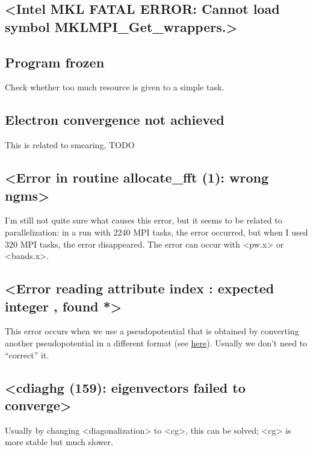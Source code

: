 \documentclass[hyperref, a4paper, 12pt]{report}
\def\texttt#1{<#1>}%
\newcommand{\shortcode}[1]{\texttt{#1}}
\begin{document}
\subsection{\shortcode{Intel MKL FATAL ERROR: Cannot load symbol MKLMPI_Get_wrappers.}}



\subsection{Program frozen}


Check whether too much resource is given to a simple task.

\subsection{Electron convergence not achieved}

This is related to smearing, TODO 

\subsection{\shortcode{Error in routine allocate_fft (1): wrong ngms}}\label{sec:ngms}

I'm still not quite sure what causes this error,
but it seems to be related to parallelization:
in a run with 2240 MPI tasks, 
the error occurred,
but when I used 320 MPI tasks,
the error disappeared.
The error can occur with \shortcode{pw.x} or \shortcode{bands.x}.

\subsection{\shortcode{Error reading attribute index : expected integer , found *}}

This error occurs when we use a pseudopotential 
that is obtained by converting another pseudopotential in a different format
(see \href{https://lists.quantum-espresso.org/pipermail/users/2021-February/046995.html}{here}). 
Usually we don't need to ``correct'' it.

\subsection{\shortcode{cdiaghg (159): eigenvectors failed to converge}}

Usually by changing \shortcode{diagonalization} to \shortcode{cg},
this can be solved; 
\shortcode{cg} is more stable but much slower.
\end{document}
